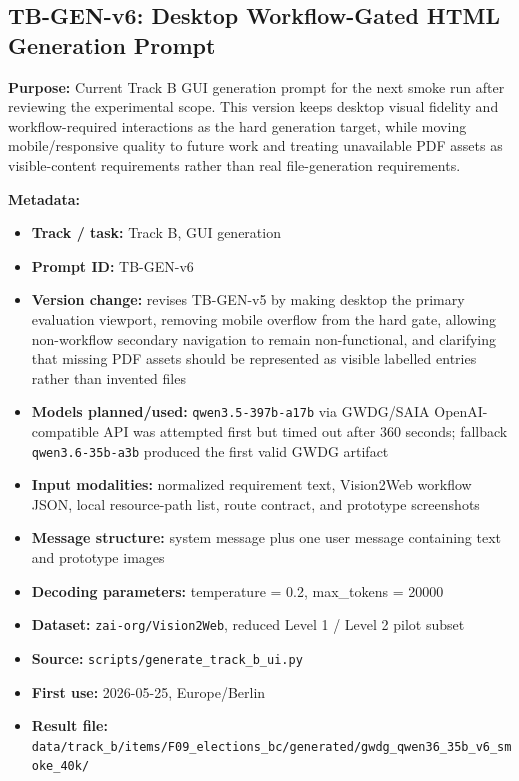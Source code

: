 \subsection{TB-GEN-v6: Desktop Workflow-Gated HTML Generation Prompt}
\label{app:prompt-tb-gen-v6}

\textbf{Purpose:} Current Track B GUI generation prompt for the next smoke
run after reviewing the experimental scope. This version keeps desktop visual
fidelity and workflow-required interactions as the hard generation target,
while moving mobile/responsive quality to future work and treating unavailable
PDF assets as visible-content requirements rather than real file-generation
requirements.

\textbf{Metadata:}
\begin{itemize}
  \item \textbf{Track / task:} Track B, GUI generation
  \item \textbf{Prompt ID:} TB-GEN-v6
  \item \textbf{Version change:} revises TB-GEN-v5 by making desktop the
  primary evaluation viewport, removing mobile overflow from the hard gate,
  allowing non-workflow secondary navigation to remain non-functional, and
  clarifying that missing PDF assets should be represented as visible labelled
  entries rather than invented files
  \item \textbf{Models planned/used:} \texttt{qwen3.5-397b-a17b} via GWDG/SAIA
  OpenAI-compatible API was attempted first but timed out after 360 seconds;
  fallback \texttt{qwen3.6-35b-a3b} produced the first valid GWDG artifact
  \item \textbf{Input modalities:} normalized requirement text, Vision2Web
  workflow JSON, local resource-path list, route contract, and prototype
  screenshots
  \item \textbf{Message structure:} system message plus one user message
  containing text and prototype images
  \item \textbf{Decoding parameters:} temperature = 0.2, max\_tokens = 20000
  \item \textbf{Dataset:} \texttt{zai-org/Vision2Web}, reduced Level 1 /
  Level 2 pilot subset
  \item \textbf{Source:} \texttt{scripts/generate\_track\_b\_ui.py}
  \item \textbf{First use:} 2026-05-25, Europe/Berlin
  \item \textbf{Result file:} \texttt{data/track\_b/items/F09\_elections\_bc/generated/gwdg\_qwen36\_35b\_v6\_smoke\_40k/}
\end{itemize}

